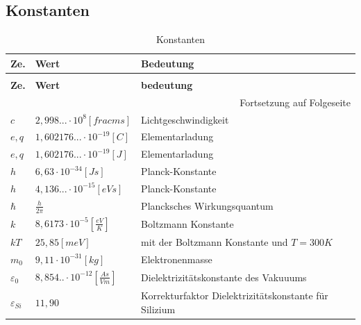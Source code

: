 \documentclass[12pt,a4paper]{report}%
\numberwithin{equation}{section}
\def\bracks#1{\left[ #1 \right]}
\numberwithin{equation}{subsection}
\begin{document}
	\subsection{Konstanten} \label{ch:constants}
	\renewcommand{\arraystretch}{1.5}
	
	\begin{longtable} {|p{0.6cm}|p{4.4cm}|p{8.4cm}|} \hline
	\textbf{Ze.} & \textbf{Wert} & \textbf{Bedeutung}\\
	\hline
	\endfirsthead %
	\caption{Konstanten}\\ \hline
	\textbf{Ze.} & \textbf{Wert} & \textbf{bedeutung}\\
	\hline
	\endhead %
	\multicolumn{3}{r}{Fortsetzung auf Folgeseite}\\
	\endfoot
	\hline
	\endlastfoot
	
	$c$ & $2,998...\cdot 10^8 \bracks{frac{m}{s}}$ & Lichtgeschwindigkeit\\ \hline
	$e,q$ & $1,602176...\cdot 10^{-19}\bracks{C}$ & Elementarladung\\ \hline
	$e,q$ & $1,602176...\cdot 10^{-19}\bracks{J}$ & Elementarladung\\ \hline
	$h$ & $6,63 \cdot 10^{-34} \bracks{Js}$ & Planck-Konstante\\ \hline
	$h$ & $4,136...\cdot 10^{-15} \bracks{eVs}$ & Planck-Konstante\\ \hline
	$\hbar$ & $\frac{h}{2\pi}$ & Plancksches Wirkungsquantum\\ \hline
	$k$ & $8,6173 \cdot 10^{-5} \bracks{\frac{eV}{K}}$ & Boltzmann Konstante\\ \hline
	$kT$ & $25,85 \bracks{meV}$ & mit der Boltzmann Konstante und $T=300K$ \\ \hline
	$m_0$ & $9,11 \cdot 10^{-31} \bracks{kg}$ & Elektronenmasse\\ \hline
	 
	
	$\varepsilon_0$ & $8,854..\cdot 10^{-12}\bracks{\frac{As}{Vm}}$ & Dielektrizitätskonstante des Vakuuums \\ \hline
	$\varepsilon_{Si}$ & $11,90$ & Korrekturfaktor Dielektrizitätskonstante für Silizium\\ \hline
	\end{longtable}
	\renewcommand{\arraystretch}{1}
\end{document}
